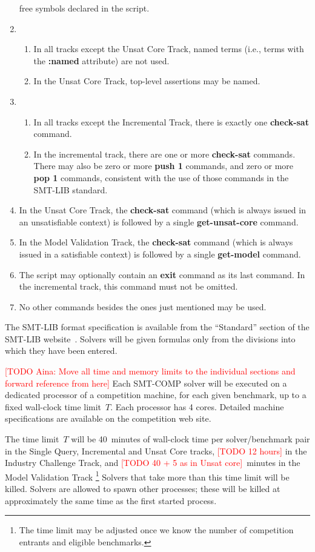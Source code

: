 \documentclass[12pt]{article}
\newcommand{\akey}[1]{\textbf{#1}}
\newcommand{\rem}[1]{\textcolor{red}{[#1]}}
\newcommand{\todo}[1]{\rem{TODO #1}}
\newcommand{\main}{Single Query\xspace}
\newcommand{\incremental}{Incremental\xspace}
\newcommand{\ucore}{Unsat Core\xspace}
\newcommand{\mval}{Model Validation\xspace}
\newcommand{\challenge}{Industry Challenge\xspace}
\begin{document}
\begin{enumerate}
  free symbols declared in the script.
\item
  \begin{enumerate}
    \item In all tracks except the \ucore Track,  named terms (i.e., terms
      with the \akey{:named} attribute) are not used.
    \item In the \ucore Track, top-level assertions may be named.
  \end{enumerate}
\item
  \begin{enumerate}
  \item In all tracks except the \incremental Track, there is exactly one
    \akey{check-sat} command.
  \item In the incremental track, there are one or more
    \akey{check-sat} commands.  There may also be zero or more
    \akey{push 1} commands, and zero or more \akey{pop 1} commands,
    consistent with the use of those commands in the SMT-LIB standard.
  \end{enumerate}
\item In the \ucore Track, the \akey{check-sat} command (which is
  always issued in an unsatisfiable context) is followed by a single
  \akey{get-unsat-core} command.
\item In the \mval Track, the \akey{check-sat} command (which is
  always issued in a satisfiable context) is followed by a single
  \akey{get-model} command.
\item The script may optionally contain an \akey{exit} command as its
  last command.  In the incremental track, this command must not be
  omitted.
\item No other commands besides the ones just mentioned may be used.
\end{enumerate}
%
The SMT-LIB format specification is available from the ``Standard''
section of the SMT-LIB website~\cite{SMT-LIB}.  Solvers will be given
formulas only from the divisions into which they have been entered.

 \todo{Aina: Move all time and memory limits to the individual sections and forward reference from here}
%
Each SMT-COMP solver will be executed on a dedicated processor of a
competition machine, for each given benchmark, up to a fixed
wall-clock time limit~$T$.  Each processor has 4 cores.  Detailed
machine specifications are available on the competition web site.

The time limit~$T$ will be 40~minutes of wall-clock time per solver/benchmark
pair in the \main, \incremental and \ucore tracks, \todo{12 hours} in the
\challenge Track, and \todo{40 + 5 as in Unsat core}~minutes in the \mval Track \footnote{The time limit may be
adjusted once we know the number of competition entrants and eligible
benchmarks.}  Solvers that take more than this time limit will be killed.
Solvers are allowed to spawn other processes; these will be killed at
approximately the same time as the first started process.
\end{document}
